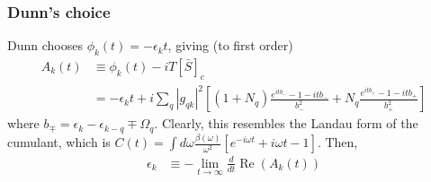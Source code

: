 \begin{frame}
    \frametitle{Dunn's choice}
 Dunn chooses $\phi_k(t)= -\epsilon_k t$, giving (to first order)
\begin{align}
    A_k(t) &\equiv \phi_k(t) - i T[\bar{S}]_c \\
&= -\epsilon_k t + i \sum_q |g_{qk}|^2 \left[ \left(1 + N_q \right) \frac{e^{i t b_{-}} - 1 - i t b_{-}}{b_{-}^2} + N_q \frac{e^{i t b_{+}} - 1 - i t b_{+}}{b_{+}^2} \right]
\end{align}
where $b_{\mp} = \epsilon_k - \epsilon_{k - q} \mp \Omega_q$. Clearly, this resembles the Landau form of the cumulant, which is $C(t)=\int d \omega \frac{\beta(\omega)}{\omega^2}\left[e^{-i \omega t}+i \omega t-1\right]$. Then,
\begin{align}
    \epsilon_k &\equiv -\lim_{t \rightarrow \infty} \frac{d}{d t} \operatorname{Re} \left( A_k(t) \right) \\

\end{align}
\end{frame}
